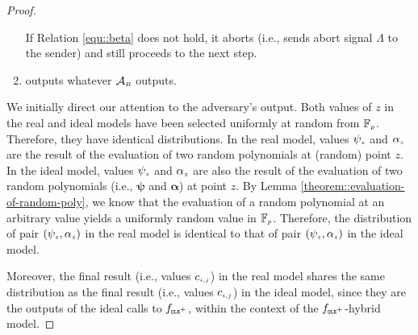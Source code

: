 \begin{proof}
\begin{enumerate}
%







%
 If Relation \ref{equ::beta} does not hold, it aborts (i.e., sends abort signal $\Lambda$ to the sender) and still proceeds to the next step. 
 
 \item outputs whatever $\mathcal{A}_{\scriptscriptstyle R}$ outputs. 
%
\end{enumerate}

We initially direct our attention to the adversary's output. Both values of $z$ in the real and ideal models have been selected uniformly at random from $\mathbb{F}_{\scriptscriptstyle p}$. Therefore, they have identical distributions. In the real model, values  $\psi_{\scriptscriptstyle z}$ and $\alpha_{\scriptscriptstyle z}$ are the result of the evaluation of two random polynomials at (random) point $z$. In the ideal model, values $\psi_{\scriptscriptstyle  z}$ and $\alpha_{\scriptscriptstyle z}$ are also the result of the evaluation of two random polynomials (i.e., ${\bm\psi}$ and ${\bm\alpha}$) at point $ z$.  By Lemma \ref{theorem::evaluation-of-random-poly}, we know that the evaluation of a random polynomial at an arbitrary value  
 yields a uniformly random value in $\mathbb{F}_{\scriptscriptstyle p}$. Therefore, the distribution of pair $(\psi_{\scriptscriptstyle z}, \alpha_{\scriptscriptstyle z})$ in the real model is identical to that of pair $( \psi_{\scriptscriptstyle  z}, \alpha_{\scriptscriptstyle  z})$ in the ideal model. 
 
 Moreover, the final result (i.e., values ${c}_{\scriptscriptstyle i,j}$) in the real model shares the same distribution as the final result (i.e., values ${c}_{\scriptscriptstyle i,j}$)  in the ideal model, since they are the outputs of the ideal calls to $f_{\scriptscriptstyle \mathtt{OLE}^{\scriptscriptstyle +}}$, within the context of the $f_{\scriptscriptstyle \mathtt{OLE}^{\scriptscriptstyle +}}$-hybrid model. 


\end{proof}
